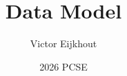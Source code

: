 \documentclass[10pt]{beamer}
\begin{document}
\author[Eijkhout]{Victor Eijkhout}
\date[2026]{2026 PCSE}
\title[data]{Data Model}
\maketitle


\end{document}
